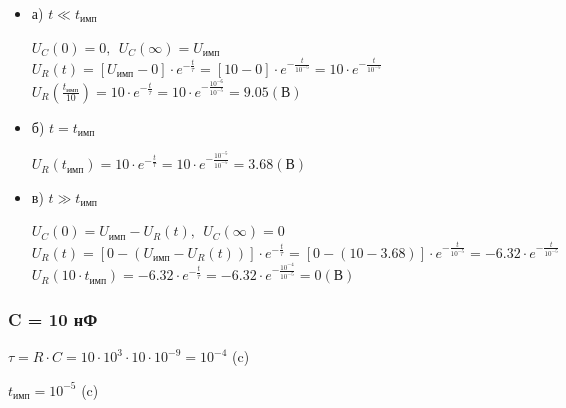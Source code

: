 \begin{itemize}
\item[] а) $t \ll t_\text{имп}$

		$U_C(0)	= 0,\ \ U_C(\infty) = U_\text{имп}$\\
		$U_R(t) = [U_\text{имп} - 0] \cdot e^{-\frac{t}{\tau}} = [10 - 0] \cdot e^{-\frac{t}{10^{-5}}} = 10 \cdot e^{-\frac{t}{10^{-5}}}$\\
		$U_R(\frac{t_\text{имп}}{10}) = 10 \cdot e^{-\frac{t}{\tau}} = 10 \cdot e^{-\frac{10^{-6}}{10^{-5}}} = 9.05 (\text{В})$\\

\item[] б) $t = t_\text{имп}$

		$U_R(t_\text{имп}) = 10 \cdot e^{-\frac{t}{\tau}} = 10 \cdot e^{-\frac{10^{-5}}{10^{-5}}} = 3.68 (\text{В})$\\

	
\item[] в) $t \gg t_\text{имп}$

		$U_C(0)	= U_\text{имп} - U_R(t),\ \ U_C(\infty) = 0$\\
		$U_R(t) = [0 - (U_\text{имп} - U_R(t))] \cdot e^{-\frac{t}{\tau}} = [0 - (10 - 3.68)] \cdot e^{-\frac{t}{10^{-5}}} = -6.32 \cdot e^{-\frac{t}{10^{-5}}}$\\
		$U_R(10 \cdot t_\text{имп}) = -6.32 \cdot e^{-\frac{t}{\tau}} = -6.32 \cdot e^{-\frac{10^{-4}}{10^{-5}}} = 0 (\text{В})$\\
\end{itemize}

\subsubsection{C = 10 нФ}

		$\tau = R \cdot C = 10 \cdot 10^3 \cdot 10 \cdot 10^{-9} = 10^{-4}$ (c)
		
		$t_\text{имп} = 10^{-5}$ (c)


